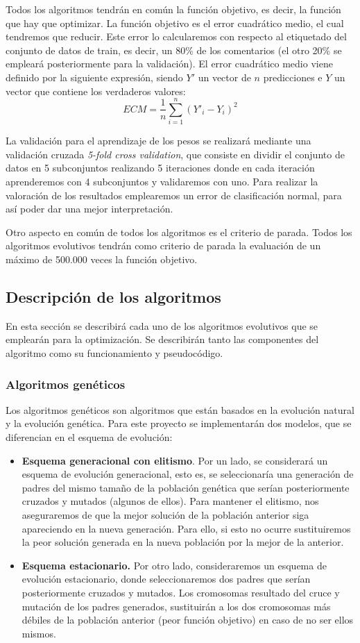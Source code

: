  Todos los algoritmos tendrán en común la función objetivo, es decir, la función que hay que optimizar. La función objetivo es el error cuadrático medio, el cual tendremos que reducir. Este error lo calcularemos con respecto al etiquetado del conjunto de datos de train, es decir, un 80\% de los comentarios (el otro 20\% se empleará posteriormente para la validación). El error cuadrático medio viene definido por la siguiente expresión, siendo $Y'$ un vector de $n$ predicciones e $Y$ un vector que contiene los verdaderos valores:
 $$ECM = \frac{1}{n}\sum_{i=1}^{n}(Y'_i-Y_i)^2$$
 
 La validación para el aprendizaje de los pesos se realizará mediante una validación cruzada \textit{5-fold cross validation}, que consiste en dividir el conjunto de datos en 5 subconjuntos realizando 5 iteraciones donde en cada iteración aprenderemos con 4 subconjuntos y validaremos con uno. Para realizar la valoración de los resultados emplearemos un error de clasificación normal, para así poder dar una mejor interpretación.
 
 Otro aspecto en común de todos los algoritmos es el criterio de parada. Todos los algoritmos evolutivos tendrán como criterio de parada la evaluación de un máximo de 500.000 veces la función objetivo.
 
 \subsection{Descripción de los algoritmos} \label{algorithms}
 En esta sección se describirá cada uno de los algoritmos evolutivos que se emplearán para la optimización. Se describirán tanto las componentes del algoritmo como su funcionamiento y pseudocódigo.
 
 \subsubsection{Algoritmos genéticos}
 Los algoritmos genéticos son algoritmos que están basados en la evolución natural y la evolución genética. Para este proyecto se implementarán dos modelos, que se diferencian en el esquema de evolución:
 \begin{itemize}
 	\item \textbf{Esquema generacional con elitismo}. Por un lado, se considerará un esquema de
 	evolución generacional, esto es, se seleccionaría una generación de padres del mismo tamaño de
 	la población genética que serían posteriormente cruzados y mutados (algunos de ellos). Para
 	mantener el elitismo, nos aseguraremos de que la mejor solución de la población anterior siga
 	apareciendo en la nueva generación. Para ello, si esto no ocurre sustituiremos la peor solución
 	generada en la nueva población por la mejor de la anterior.
 	\item \textbf{Esquema estacionario.} Por otro lado, consideraremos un esquema de evolución estacionario,
 	donde seleccionaremos dos padres que serían posteriormente cruzados y mutados. Los cromosomas resultado del cruce y mutación de los padres generados, sustituirán
 	a los dos cromosomas más débiles de la población anterior (peor función objetivo) en caso de no
 	ser ellos mismos.
 \end{itemize}


